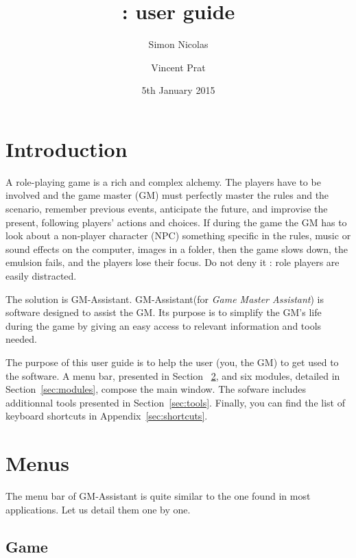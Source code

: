 \documentclass[a4paper,12pt]{article}
\title{\GMA \versionnumber: user guide}
\author{Simon Nicolas \and Vincent Prat}
\date{5th January 2015}
\newcommand*{\GMA}{GM-Assistant\xspace}
\begin{document}
\maketitle

\latex{\tableofcontents}

\section{Introduction}

A role-playing game is a rich and complex alchemy.
The players have to be involved and the game master (GM) must perfectly master the rules and the scenario, remember previous events, anticipate the future, and improvise the present, following players' actions and choices.
If during the game the GM has to look about a non-player character (NPC) something specific in the rules, music or sound effects on the computer, images in a folder, then the game slows down, the emulsion fails, and the players lose their focus.
Do not deny it : role players are easily distracted.

The solution is \GMA.
\GMA (for \emph{Game Master Assistant}) is software designed to assist the GM. Its purpose is to simplify the GM’s life during the game by giving an easy access to relevant information and tools needed.

The purpose of this user guide is to help the user (you, the GM) to get used to the software. A menu bar, presented in Section ~\ref{menu}, and six modules, detailed in Section~\ref{sec:modules}, compose the main window. The sofware includes additionnal tools presented in Section~\ref{sec:tools}.
Finally, you can find the list of keyboard shortcuts in Appendix~\ref{sec:shortcuts}. 

\section{Menus}
\label{menu}

The menu bar of \GMA is quite similar to the one found in most applications.
Let us detail them one by one.
\subsection{Game}
\label{sec:game}
\end{document}
